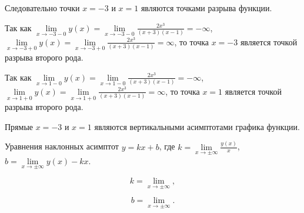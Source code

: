 \documentclass[fleqn]{article}
\begin{document}
Следовательно точки $x=-3$ и $x=1$ являются точками разрыва функции.

Так как $\lim\limits_{x\to-3-0}y(x)=\lim\limits_{x\to-3-0}\frac{2x^3}{(x+3)(x-1)}=-\infty$, $\lim\limits_{x\to-3+0}y(x)=\lim\limits_{x\to-3+0}\frac{2x^3}{(x+3)(x-1)}=\infty$, то точка $x=-3$ является точкой разрыва второго рода.

Так как $\lim\limits_{x\to1-0}y(x)=\lim\limits_{x\to1-0}\frac{2x^3}{(x+3)(x-1)}=-\infty$, $\lim\limits_{x\to1+0}y(x)=\lim\limits_{x\to1+0}\frac{2x^3}{(x+3)(x-1)}=\infty$, то точка $x=1$ является точкой разрыва второго рода.

Прямые $x=-3$ и $x=1$ являются вертикальными асимптотами графика функции.

Уравнения наклонных асимптот $y=kx+b$, где $k=\lim\limits_{x\to\pm\infty}\frac{y(x)}{x}$, $b=\lim\limits_{x\to\pm\infty}y(x)-kx$.

$$k=\lim\limits_{x\to\pm\infty},$$

$$b=\lim\limits_{x\to\pm\infty}.$$
\end{document}
